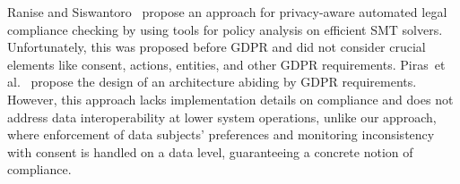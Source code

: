 Ranise and Siswantoro~\cite{ranise_automated_2017} propose an approach for privacy-aware automated legal compliance checking by using tools for policy analysis on efficient SMT solvers. Unfortunately, this was proposed before GDPR and did not consider crucial elements like consent, actions, entities, and other GDPR requirements. Piras~{et al.}~\cite{piras_defend_2019} propose the design of an architecture abiding by GDPR requirements. However, this approach lacks implementation details on compliance and does not address data interoperability at lower system operations, unlike our approach, where enforcement of data subjects' preferences and monitoring inconsistency with consent is handled on a data level, guaranteeing a concrete notion of compliance.

